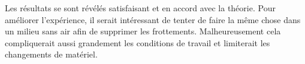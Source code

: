 Les résultats se sont révélés satisfaisant et en accord avec la théorie.
Pour améliorer l'expérience, il serait intéressant de tenter de faire la même chose dans un milieu sans air afin de supprimer les frottements. Malheureusement cela compliquerait aussi grandement les conditions de travail et limiterait les changements de matériel.
